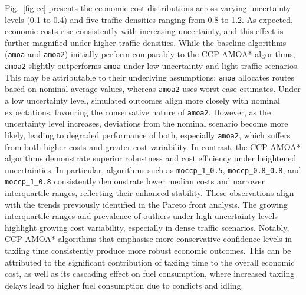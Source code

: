 \documentclass{article}
\begin{document}
Fig.~\ref{fig:ec} presents the economic cost distributions across varying uncertainty levels (0.1 to 0.4) and five traffic densities ranging from 0.8 to 1.2. As expected, economic costs rise consistently with increasing uncertainty, and this effect is further magnified under higher traffic densities. While the baseline algorithms (\texttt{amoa} and \texttt{amoa2}) initially perform comparably to the CCP-AMOA* algorithms, \texttt{amoa2} slightly outperforms \texttt{amoa} under low-uncertainty and light-traffic scenarios. This may be attributable to their underlying assumptions: \texttt{amoa} allocates routes based on nominal average values, whereas \texttt{amoa2} uses worst-case estimates. Under a low uncertainty level, simulated outcomes align more closely with nominal expectations, favouring the conservative nature of \texttt{amoa2}. However, as the uncertainty level increases, deviations from the nominal scenario become more likely, leading to degraded performance of both, especially \texttt{amoa2}, which suffers from both higher costs and greater cost variability. In contrast, the CCP-AMOA* algorithms demonstrate superior robustness and cost efficiency under heightened uncertainties. In particular, algorithms such as \texttt{moccp\_1\_0.5}, \texttt{moccp\_0.8\_0.8}, and \texttt{moccp\_1\_0.8} consistently demonstrate lower median costs and narrower interquartile ranges, reflecting their enhanced stability. These observations align with the trends previously identified in the Pareto front analysis. The growing interquartile ranges and prevalence of outliers under high uncertainty levels highlight growing cost variability, especially in dense traffic scenarios. Notably, CCP-AMOA* algorithms that emphasise more conservative confidence levels in taxiing time consistently produce more robust economic outcomes. This can be attributed to the significant contribution of taxiing time to the overall economic cost, as well as its cascading effect on fuel consumption, where increased taxiing delays lead to higher fuel consumption due to conflicts and idling.
\end{document}
